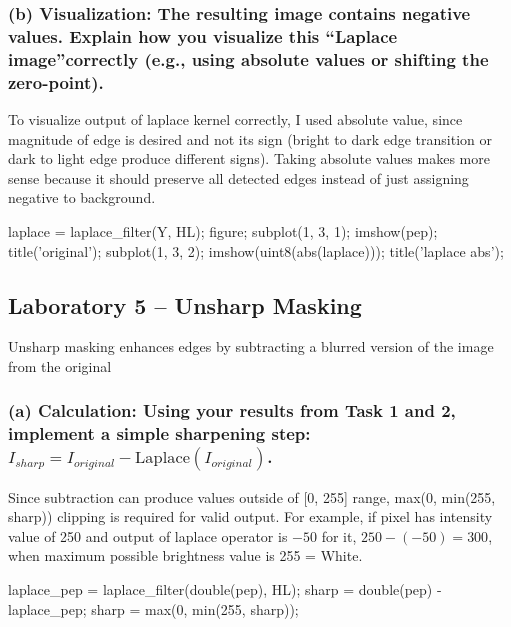 \subsubsection{(b) Visualization: The resulting image contains negative values. Explain how you visualize this ``Laplace image''correctly (e.g., using absolute values or shifting the zero-point).}

To visualize output of laplace kernel correctly, I used absolute value, since magnitude of edge is desired and not its sign (bright to dark edge transition or dark to light edge produce different signs). Taking absolute values makes more sense because it should preserve all detected edges instead of just assigning negative to background. 

\codeused
\begin{matlab}
laplace = laplace_filter(Y, HL);
figure;
subplot(1, 3, 1); imshow(pep); title('original');
subplot(1, 3, 2); imshow(uint8(abs(laplace))); title('laplace abs');
\end{matlab}

\subsection{Laboratory 5 -- Unsharp Masking}

Unsharp masking enhances edges by subtracting a blurred version of the image
from the original

\subsubsection{(a) Calculation: Using your results from Task 1 and 2, implement a simple sharpening step: \texorpdfstring{$I_{sharp} = I_{original} - \mathrm{Laplace}(I_{original})$}{Isharp = Ioriginal - Laplace(Ioriginal)}.}

Since subtraction can produce values outside of [0, 255] range, max(0, min(255, sharp)) clipping is required for valid output. For example, if pixel has intensity value of 250 and output of laplace operator is $-50$ for it, $250 - (-50) = 300$, when maximum possible brightness value is 255 = White. 

\codeused
\begin{matlab}
laplace_pep = laplace_filter(double(pep), HL);
sharp = double(pep) - laplace_pep;
sharp = max(0, min(255, sharp));
\end{matlab}

